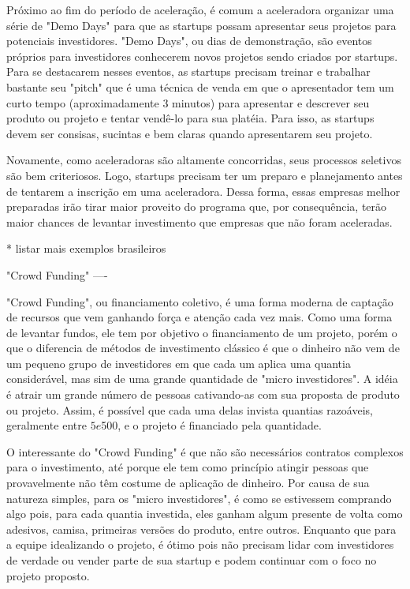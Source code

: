 Próximo ao fim do período de aceleração, é comum a aceleradora organizar uma série de "Demo Days" para que as startups possam apresentar seus projetos para potenciais investidores. "Demo Days", ou dias de demonstração, são eventos próprios para investidores conhecerem novos projetos sendo criados por startups. Para se destacarem nesses eventos, as startups precisam treinar e trabalhar bastante seu "pitch" que é uma técnica de venda em que o apresentador tem um curto tempo (aproximadamente 3 minutos) para apresentar e descrever seu produto ou projeto e tentar vendê-lo para sua platéia. Para isso, as startups devem ser consisas, sucintas e bem claras quando apresentarem seu projeto.

Novamente, como aceleradoras são altamente concorridas, seus processos seletivos são bem criteriosos. Logo, startups precisam ter um preparo e planejamento antes de tentarem a inscrição em uma aceleradora. Dessa forma, essas empresas melhor preparadas irão tirar maior proveito do programa que, por consequência, terão maior chances de levantar investimento que empresas que não foram aceleradas.

* listar mais exemplos brasileiros


"Crowd Funding"
----

"Crowd Funding", ou financiamento coletivo, é uma forma moderna de captação de recursos que vem ganhando força e atenção cada vez mais. Como uma forma de levantar fundos, ele tem por objetivo o financiamento de um projeto, porém o que o diferencia de métodos de investimento clássico é que o dinheiro não vem de um pequeno grupo de investidores em que cada um aplica uma quantia considerável, mas sim de uma grande quantidade de "micro investidores". A idéia é atrair um grande número de pessoas cativando-as com sua proposta de produto ou projeto. Assim, é possível que cada uma delas invista quantias razoáveis, geralmente entre $5 e $500, e o projeto é financiado pela quantidade.

O interessante do "Crowd Funding" é que não são necessários contratos complexos para o investimento, até porque ele tem como princípio atingir pessoas que provavelmente não têm costume de aplicação de dinheiro. Por causa de sua natureza simples, para os "micro investidores", é como se estivessem comprando algo pois, para cada quantia investida, eles ganham algum presente de volta como adesivos, camisa, primeiras versões do produto, entre outros. Enquanto que para a equipe idealizando o projeto, é ótimo pois não precisam lidar com investidores de verdade ou vender parte de sua startup e podem continuar com o foco no projeto proposto.

